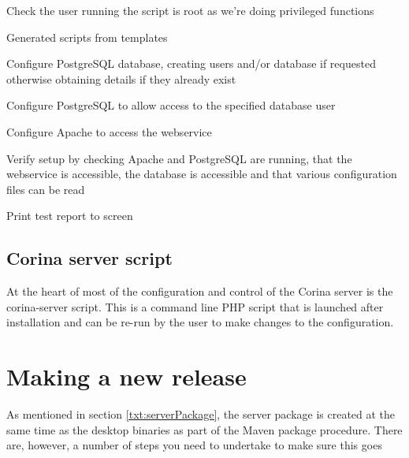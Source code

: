 \begin{itemize*}
 \item Check the user running the script is root as we're doing privileged functions
 \item Generated scripts from templates
 \item Configure PostgreSQL database, creating users and/or database if requested otherwise obtaining details if they already exist
 \item Configure PostgreSQL to allow access to the specified database user
 \item Configure Apache to access the webservice
 \item Verify setup by checking Apache and PostgreSQL are running, that the webservice is accessible, the database is accessible and that various configuration files can be read
 \item Print test report to screen
\end{itemize*}

\subsection{Corina server script}
\label{txt:corina-server-script}

At the heart of most of the configuration and control of the Corina server is the corina-server script.  This is a command line PHP script that is launched after installation and can be re-run by the user to make changes to the configuration.

\section{Making a new release}

As mentioned in section \ref{txt:serverPackage}, the server package is created at the same time as the desktop binaries as part of the Maven package procedure.  There are, however, a number of steps you need to undertake to make sure this goes 



